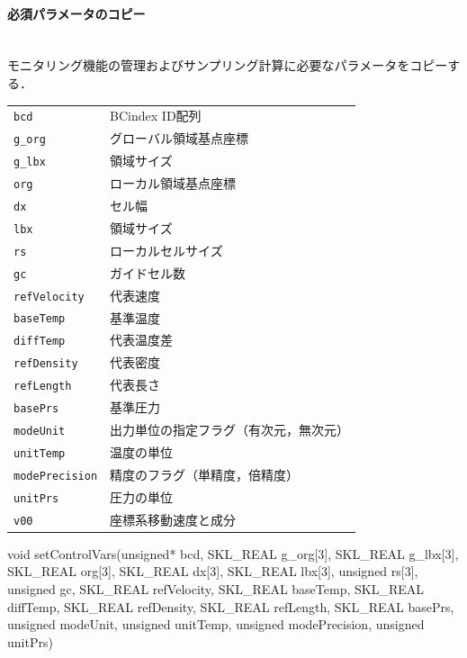 \paragraph{必須パラメータのコピー}\mbox{}\\
モニタリング機能の管理およびサンプリング計算に必要なパラメータをコピーする．

\begin{table}[hp]
\begin{tabular}{ll}
{\tt bcd} & BCindex ID配列\\
{\tt g\_org} & グローバル領域基点座標\\
{\tt g\_lbx} & 領域サイズ\\
{\tt org} & ローカル領域基点座標\\
{\tt dx} & セル幅\\
{\tt lbx} & 領域サイズ\\
{\tt rs} & ローカルセルサイズ\\
{\tt gc} & ガイドセル数\\
{\tt refVelocity} & 代表速度\\
{\tt baseTemp} & 基準温度\\
{\tt diffTemp} & 代表温度差\\
{\tt refDensity} & 代表密度\\
{\tt refLength} & 代表長さ\\
{\tt basePrs} & 基準圧力\\
{\tt modeUnit} & 出力単位の指定フラグ（有次元，無次元）\\
{\tt unitTemp} & 温度の単位\\
{\tt modePrecision} & 精度のフラグ（単精度，倍精度）\\
{\tt unitPrs} & 圧力の単位\\
{\tt v00} & 座標系移動速度と成分\\
\end{tabular}
\end{table}

{\small
\begin{program}
void setControlVars(unsigned* bcd, SKL_REAL g_org[3], SKL_REAL g_lbx[3],
                  SKL_REAL org[3], SKL_REAL dx[3], SKL_REAL lbx[3],
                  unsigned rs[3], unsigned gc,
                  SKL_REAL refVelocity, SKL_REAL baseTemp, SKL_REAL diffTemp,
                  SKL_REAL refDensity, SKL_REAL refLength, SKL_REAL basePrs,
                  unsigned modeUnit, unsigned unitTemp,
                  unsigned modePrecision, unsigned unitPrs)
\end{program}
}

